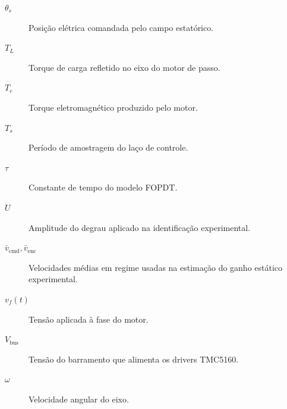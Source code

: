 \begin{description}
    \item[$\theta_s$] \quad Posição elétrica comandada pelo campo estatórico.
    \item[$T_L$] \quad Torque de carga refletido no eixo do motor de passo.
    \item[$T_e$] \quad Torque eletromagnético produzido pelo motor.
    \item[$T_s$] \quad Período de amostragem do laço de controle.
    \item[$\tau$] \quad Constante de tempo do modelo FOPDT.
    \item[$U$] \quad Amplitude do degrau aplicado na identificação experimental.
    \item[$\bar{v}_{\text{cmd}}, \bar{v}_{\text{enc}}$] \quad Velocidades médias em regime usadas na estimação do ganho estático experimental.
    \item[$v_f(t)$] \quad Tensão aplicada à fase do motor.
    \item[$V_{\text{bus}}$] \quad Tensão do barramento que alimenta os drivers TMC5160.
    \item[$\omega$] \quad Velocidade angular do eixo.
\end{description}
